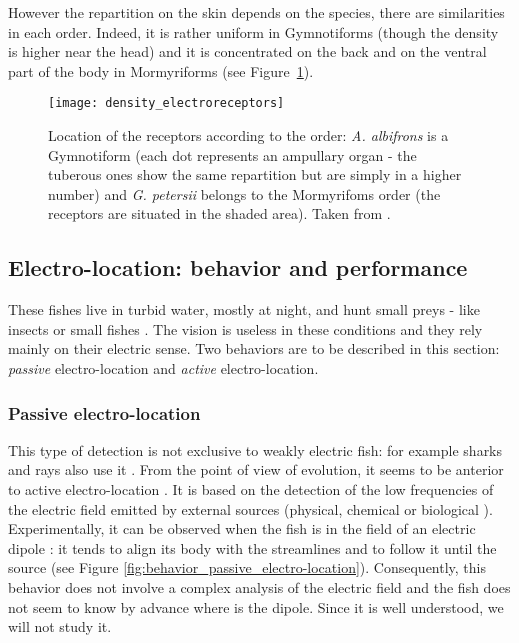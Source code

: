 However the repartition on the skin depends on the species, there
are similarities in each order. Indeed, it is rather uniform in Gymnotiforms
(though the density is higher near the head) and it is concentrated
on the back and on the ventral part of the body in Mormyriforms (see
Figure~\ref{fig:density_electroreceptor}). %
\begin{figure}[h]
 \centering \texttt{[image: density\_electroreceptors]}
\caption{Location of the receptors according to the order: \emph{A. albifrons}
is a Gymnotiform (each dot represents an ampullary organ - the tuberous
ones show the same repartition but are simply in a higher number)
and \emph{G. petersii} belongs to the Mormyrifoms order (the receptors
are situated in the shaded area). Taken from \cite{moller1995electric}.
\label{fig:density_electroreceptor}}

\end{figure}



\subsection{Electro-location: behavior and performance}

\label{sub:electro-localisation}

These fishes live in turbid water, mostly at night, and hunt small
preys - like insects or small fishes
\cite{albert2005diversity,okedi1971food}. The vision is useless in
these conditions and they rely mainly on their electric sense. Two
behaviors are to be described in this section: \emph{passive
}electro-location and \emph{active }electro-location.


\subsubsection*{Passive electro-location}

This type of detection is not exclusive to weakly electric fish:
for example sharks and rays also use it
\cite{adair1998detection,kalmijn-1988}. From the point of view of
evolution, it seems to be anterior to active electro-location
\cite{lissmann1958evolution}. It is based on the detection of the
low frequencies of the electric field emitted by external sources
(physical, chemical or biological \cite{kalmijn-1988}).
Experimentally, it can be observed when the fish is in the field
of an electric dipole \cite{hopkins-passive}: it tends to align
its body with the streamlines and to follow it until the source
(see Figure \ref{fig:behavior_passive_electro-location}).
Consequently, this behavior does not involve a complex analysis of
the electric field and the fish does not seem to know by advance
where is the dipole. Since it is well understood, we will not
study it.

